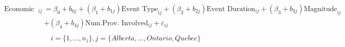 \begin{align}
\begin{split}
\text{Economic Cost}_{ij}&=\beta_0+b_{0j}+(\beta_{1}+b_{1j})\text{Event Type}_{ij}+(\beta_{2}+b_{2j})\text{Event Duration}_{ij}+(\beta_{3}+b_{3j})\text{Magnitude}_{ij}\\ &+(\beta_{4}+b_{4j})\text{Num.Prov. Involved}_{ij}+\varepsilon_{ij}\\
\end{split}
\label{econ_province}
\end{align}
\begin{equation*}
i=\{1,...,n_j\},
j=\{Alberta,...,Ontario, Quebec\}
\end{equation*}
